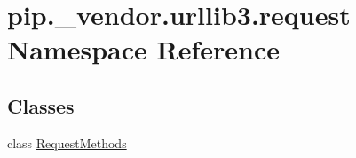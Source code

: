 \hypertarget{namespacepip_1_1__vendor_1_1urllib3_1_1request}{}\section{pip.\+\_\+vendor.\+urllib3.\+request Namespace Reference}
\label{namespacepip_1_1__vendor_1_1urllib3_1_1request}
\subsection*{Classes}
\begin{DoxyCompactItemize}
\item 
class \hyperlink{classpip_1_1__vendor_1_1urllib3_1_1request_1_1RequestMethods}{Request\+Methods}
\end{DoxyCompactItemize}

